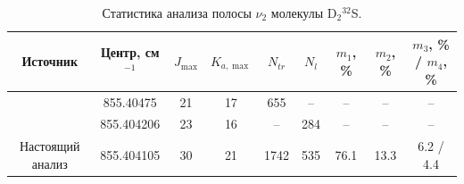 \begin{landscape}
\begin{table}[htbp]
\centering
\caption{Статистика анализа полосы $\nu_2$ молекулы D$_2{}^{32}$S.}
\label{tab:d2s_statistics}
\small
\begin{tabular}{|c|c|c|c|c|c|c|c|c|}
\hline
Источник & Центр, см$^{-1}$ & $J_{\max}$ & $K_{a,\max}$ & $N_{tr}$ & $N_l$ & $m_1$, \% & $m_2$, \% & $m_3$, \% / $m_4$, \% \\
\hline
\cite{d2s_gillis1985} & 855.40475 & 21 & 17 & 655 & -- & -- & -- & -- \\
\cite{d2s_camy1988} & 855.404206 & 23 & 16 & -- & 284 & -- & -- & -- \\
Настоящий анализ & 855.404105 & 30 & 21 & 1742 & 535 & 76.1 & 13.3 & 6.2 / 4.4 \\
\hline
\end{tabular}
\end{table}
\end{landscape}
